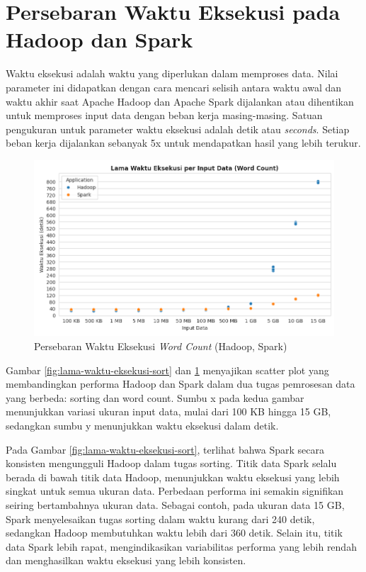 \newpage
\section {Persebaran Waktu Eksekusi pada Hadoop dan Spark}
Waktu eksekusi adalah waktu yang diperlukan dalam memproses data. Nilai parameter ini didapatkan dengan cara mencari selisih antara waktu awal dan waktu akhir saat Apache Hadoop dan Apache Spark dijalankan atau dihentikan untuk memproses input data dengan beban kerja masing-masing. Satuan pengukuran untuk parameter waktu eksekusi adalah detik atau \textit{seconds}. Setiap beban kerja dijalankan sebanyak 5x untuk mendapatkan hasil yang lebih terukur. 

\begin{figure}[h]
    \centering
    \includegraphics[width=1\textwidth]{figures/ch04/1-lama-waktu-eksekusi-wordcount.png}
    \caption{Persebaran Waktu Eksekusi \textit{Word Count} (Hadoop, Spark)}
    \label{fig:lama-waktu-eksekusi-wordcount}
\end{figure}

Gambar \ref{fig:lama-waktu-eksekusi-sort} dan \ref{fig:lama-waktu-eksekusi-wordcount} menyajikan scatter plot yang membandingkan performa Hadoop dan Spark dalam dua tugas pemrosesan data yang berbeda: sorting dan word count.  Sumbu x pada kedua gambar menunjukkan variasi ukuran input data, mulai dari 100 KB hingga 15 GB, sedangkan sumbu y menunjukkan waktu eksekusi dalam detik.

Pada Gambar \ref{fig:lama-waktu-eksekusi-sort}, terlihat bahwa Spark secara konsisten mengungguli Hadoop dalam tugas sorting. Titik data Spark selalu berada di bawah titik data Hadoop, menunjukkan waktu eksekusi yang lebih singkat untuk semua ukuran data. Perbedaan performa ini semakin signifikan seiring bertambahnya ukuran data. Sebagai contoh, pada ukuran data 15 GB, Spark menyelesaikan tugas sorting dalam waktu kurang dari 240 detik, sedangkan Hadoop membutuhkan waktu lebih dari 360 detik. Selain itu, titik data Spark lebih rapat, mengindikasikan variabilitas performa yang lebih rendah dan menghasilkan waktu eksekusi yang lebih konsisten.

